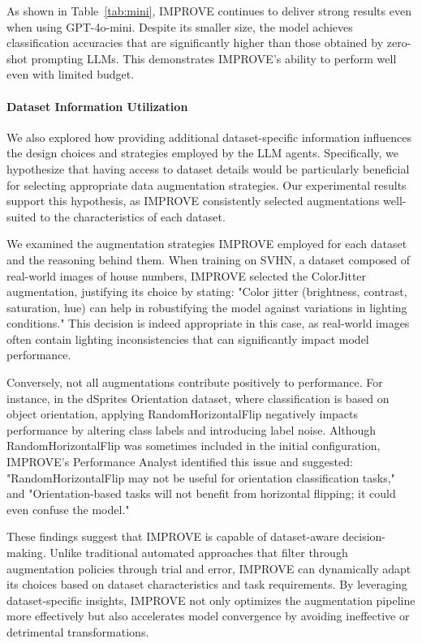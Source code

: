 As shown in Table~\ref{tab:mini}, IMPROVE continues to deliver strong results even when using GPT-4o-mini. Despite its smaller size, the model achieves classification accuracies that are significantly higher than those obtained by zero-shot prompting LLMs. This demonstrates IMPROVE's ability to perform well even with limited budget.

\paragraph{Dataset Information Utilization}
\label{sec:dataset}
We also explored how providing additional dataset-specific information influences the design choices and strategies employed by the LLM agents. Specifically, we hypothesize that having access to dataset details would be particularly beneficial for selecting appropriate data augmentation strategies. Our experimental results support this hypothesis, as IMPROVE consistently selected augmentations well-suited to the characteristics of each dataset.

We examined the augmentation strategies IMPROVE employed for each dataset and the reasoning behind them. When training on SVHN, a dataset composed of real-world images of house numbers, IMPROVE selected the ColorJitter augmentation, justifying its choice by stating: "Color jitter (brightness, contrast, saturation, hue) can help in robustifying the model against variations in lighting conditions." This decision is indeed appropriate in this case, as real-world images often contain lighting inconsistencies that can significantly impact model performance.

Conversely, not all augmentations contribute positively to performance. For instance, in the dSprites Orientation dataset, where classification is based on object orientation, applying RandomHorizontalFlip negatively impacts performance by altering class labels and introducing label noise. Although RandomHorizontalFlip was sometimes included in the initial configuration, IMPROVE’s Performance Analyst identified this issue and suggested: "RandomHorizontalFlip may not be useful for orientation classification tasks," and "Orientation-based tasks will not benefit from horizontal flipping; it could even confuse the model."

These findings suggest that IMPROVE is capable of dataset-aware decision-making. Unlike traditional automated approaches that filter through augmentation policies through trial and error, IMPROVE can dynamically adapt its choices based on dataset characteristics and task requirements. By leveraging dataset-specific insights, IMPROVE not only optimizes the augmentation pipeline more effectively but also accelerates model convergence by avoiding ineffective or detrimental transformations.